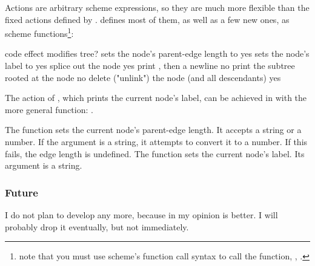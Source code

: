 Actions are arbitrary scheme expressions, so they are much more flexible than
the fixed actions defined by \ed. \sched{} defines most of them, as well as a
few new ones, as scheme functions\footnote{note that you must use scheme's function call syntax to call the function, \ie, .}:

\startalignment[center]
	\starttabulate[|c|l|c|]
		\NC code \NC effect \NC modifies tree?\NC\NR
		\HL
		\NC {}	\NC sets the node's parent-edge length to 	\NC yes \NC\NR
		\NC {}	\NC sets the node's label to 	\NC yes \NC\NR
		\NC {} 				\NC splice out the node 									\NC yes \NC\NR
		\NC {} 	\NC print , then a newline 		\NC no \NC\NR
		\NC {} 				\NC print the subtree rooted at the node 	\NC no \NC\NR
		\NC {} 				\NC delete ("unlink") the node (and all descendants) \NC yes \NC\NR
	\stoptabulate
\stopalignment

The  action of \ed{}, which prints the current node's
label, can be achieved in \sched{} with the more general  function:
.

The  function sets the current node's parent-edge length. It accepts
a string or a number. If the argument is a string, it attempts to convert it to
a number. If this fails, the edge length is undefined. The 
function sets the current node's label. Its argument is a string.

\subsubsection{Future}

I do not plan to develop \sched{} any more, because in my opinion \luaed{} is
better. I will probably drop it eventually, but not immediately.
